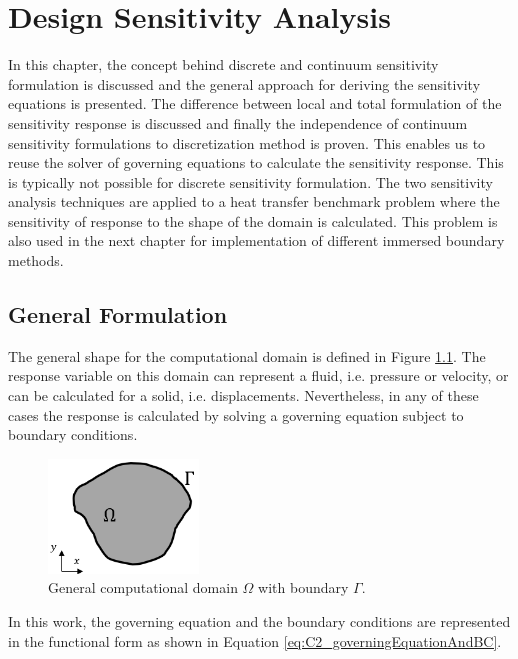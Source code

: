 \chapter{Design Sensitivity Analysis}
In this chapter, the concept behind discrete and continuum sensitivity formulation is discussed and the general approach for deriving the sensitivity equations is presented. The difference between local and total formulation of the sensitivity response is discussed and finally the independence of continuum sensitivity formulations to discretization method is proven. This enables us to reuse the solver of governing equations to calculate the sensitivity response. This is typically not possible for discrete sensitivity formulation. The two sensitivity analysis techniques are applied to a heat transfer benchmark problem where the sensitivity of response to the shape of the domain is calculated. This problem is also used in the next chapter for implementation of different immersed boundary methods.

\section{General Formulation}
The general shape for the computational domain is defined in Figure \ref{fig:C2_continuumDomain}. The response variable on this domain can represent a fluid, i.e. pressure or velocity, or can be calculated for a solid, i.e. displacements. Nevertheless, in any of these cases the response is calculated by solving a governing equation subject to boundary conditions. 

\begin{figure}
	\centering
	\includegraphics[width=4.00cm]{Chapter_2/figure/general_domain.png}
	\caption{General computational domain $\Omega$ with boundary $\Gamma$.}
	\label{fig:C2_continuumDomain}
\end{figure}

In this work, the governing equation and the boundary conditions are represented in the functional form as shown in Equation \eqref{eq:C2_governingEquationAndBC}.

